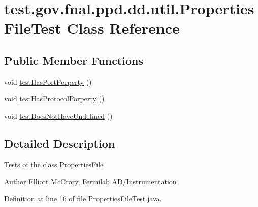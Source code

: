 \hypertarget{classtest_1_1gov_1_1fnal_1_1ppd_1_1dd_1_1util_1_1PropertiesFileTest}{\section{test.\-gov.\-fnal.\-ppd.\-dd.\-util.\-Properties\-File\-Test Class Reference}
\label{classtest_1_1gov_1_1fnal_1_1ppd_1_1dd_1_1util_1_1PropertiesFileTest}
}
\subsection*{Public Member Functions}
\begin{DoxyCompactItemize}
\item 
void \hyperlink{classtest_1_1gov_1_1fnal_1_1ppd_1_1dd_1_1util_1_1PropertiesFileTest_a8cfbcf6b00fd010a729a7c465d76de77}{test\-Has\-Port\-Porperty} ()
\item 
void \hyperlink{classtest_1_1gov_1_1fnal_1_1ppd_1_1dd_1_1util_1_1PropertiesFileTest_a111ec29545acfcabc893f8061864db6a}{test\-Has\-Protocol\-Porperty} ()
\item 
void \hyperlink{classtest_1_1gov_1_1fnal_1_1ppd_1_1dd_1_1util_1_1PropertiesFileTest_a81f9e60cdf7be477c8bfa619f600e4b4}{test\-Does\-Not\-Have\-Undefined} ()
\end{DoxyCompactItemize}


\subsection{Detailed Description}
Tests of the class Properties\-File

\begin{DoxyAuthor}{Author}
Elliott Mc\-Crory, Fermilab A\-D/\-Instrumentation 
\end{DoxyAuthor}


Definition at line 16 of file Properties\-File\-Test.\-java.



